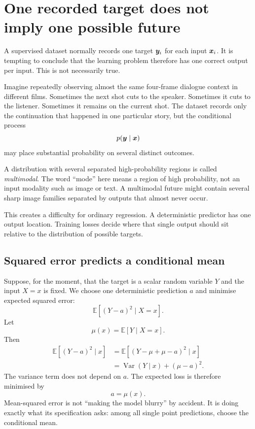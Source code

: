 \section{One recorded target does not imply one possible future}

A supervised dataset normally records one target \(\bm{y}_i\) for each input \(\bm{x}_i\). It is tempting to conclude that the learning problem therefore has one correct output per input. This is not necessarily true.

Imagine repeatedly observing almost the same four-frame dialogue context in different films. Sometimes the next shot cuts to the speaker. Sometimes it cuts to the listener. Sometimes it remains on the current shot. The dataset records only the continuation that happened in one particular story, but the conditional process
\[
  p(\bm{y}\mid\bm{x})
\]
may place substantial probability on several distinct outcomes.

A distribution with several separated high-probability regions is called \emph{multimodal}. The word ``mode'' here means a region of high probability, not an input modality such as image or text. A multimodal future might contain several sharp image families separated by outputs that almost never occur.

This creates a difficulty for ordinary regression. A deterministic predictor has one output location. Training losses decide where that single output should sit relative to the distribution of possible targets.

\subsection{Squared error predicts a conditional mean}

Suppose, for the moment, that the target is a scalar random variable \(Y\) and the input \(X=x\) is fixed. We choose one deterministic prediction \(a\) and minimise expected squared error:
\[
  \mathbb{E}\left[(Y-a)^2\mid X=x\right].
\]
Let
\[
  \mu(x)=\mathbb{E}[Y\mid X=x].
\]
Then
\begin{align}
\mathbb{E}\left[(Y-a)^2\mid x\right]
&= \mathbb{E}\left[(Y-\mu+\mu-a)^2\mid x\right]\\
&= \operatorname{Var}(Y\mid x) + (\mu-a)^2.
\end{align}
The variance term does not depend on \(a\). The expected loss is therefore minimised by
\[
  a=\mu(x).
\]
Mean-squared error is not ``making the model blurry'' by accident. It is doing exactly what its specification asks: among all single point predictions, choose the conditional mean.

